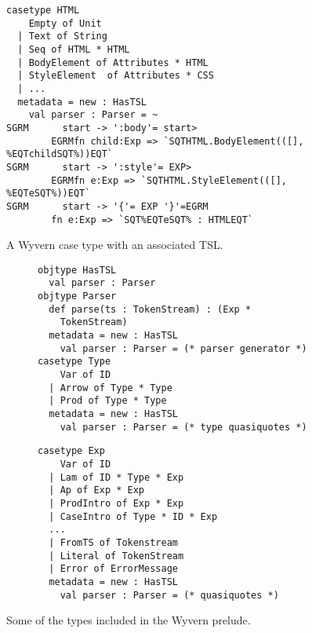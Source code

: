 {\begin{figure}
\begin{lstlisting}[escapechar=$]
casetype HTML 
    Empty of Unit
  | Text of String
  | Seq of HTML * HTML 
  | BodyElement of Attributes * HTML
  | StyleElement  of Attributes * CSS
  | ...
  metadata = new : HasTSL
    val parser : Parser = ~
SGRM      start -> ':body'= start>
        EGRMfn child:Exp => `SQTHTML.BodyElement(([], %EQTchildSQT%))EQT`
SGRM      start -> ':style'= EXP>
        EGRMfn e:Exp => `SQTHTML.StyleElement(([], %EQTeSQT%))EQT`
SGRM      start -> '{'= EXP '}'=EGRM
        fn e:Exp => `SQT%EQTeSQT% : HTMLEQT`
\end{lstlisting}
\vspace{-8px}
\caption{A Wyvern case type with an associated TSL.}
\label{f-htmltype}
\end{figure}
\begin{figure}[t]
\begin{subfigure}[t]{.53\textwidth}
\begin{lstlisting}
objtype HasTSL
  val parser : Parser
objtype Parser                          
  def parse(ts : TokenStream) : (Exp * 
    TokenStream)
  metadata = new : HasTSL
    val parser : Parser = (* parser generator *)      
casetype Type
    Var of ID
  | Arrow of Type * Type
  | Prod of Type * Type
  metadata = new : HasTSL
    val parser : Parser = (* type quasiquotes *)
\end{lstlisting}
\end{subfigure}
\begin{subfigure}[t]{.55\textwidth}
\begin{lstlisting}[linewidth=.5\textwidth]
casetype Exp 
    Var of ID
  | Lam of ID * Type * Exp
  | Ap of Exp * Exp
  | ProdIntro of Exp * Exp
  | CaseIntro of Type * ID * Exp
  ... 
  | FromTS of Tokenstream
  | Literal of TokenStream
  | Error of ErrorMessage
  metadata = new : HasTSL
    val parser : Parser = (* quasiquotes *)
\end{lstlisting}
\end{subfigure}
\caption{Some of the types included in the Wyvern prelude.}
\vspace{-10px}
\label{f-builtins}
\end{figure}

}
